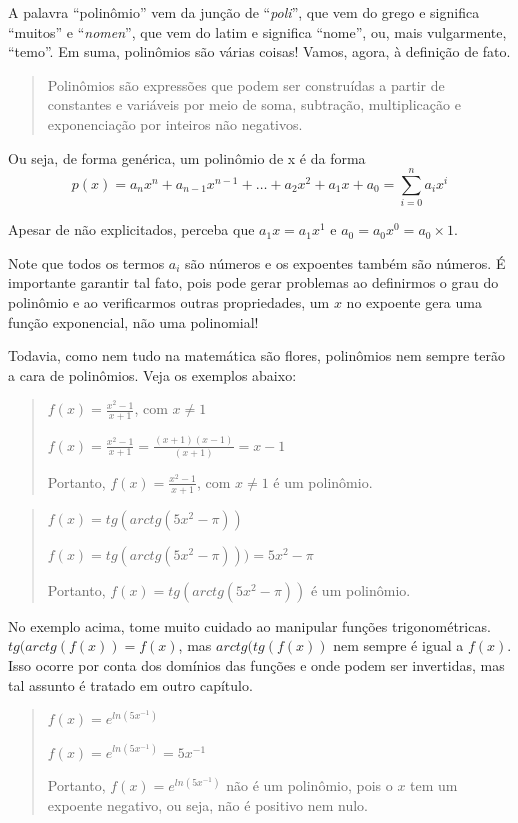\documentclass[
  letterpaper,
  DIV=11,
  numbers=noendperiod]{scrreprt}
\begin{document}
A palavra ``polinômio'' vem da junção de ``\emph{poli}'', que vem do
grego e significa ``muitos'' e ``\emph{nomen}'', que vem do latim e
significa ``nome'', ou, mais vulgarmente, ``temo''. Em suma, polinômios
são várias coisas! Vamos, agora, à definição de fato.

\begin{quote}
Polinômios são expressões que podem ser construídas a partir de
constantes e variáveis por meio de soma, subtração, multiplicação e
exponenciação por inteiros não negativos.
\end{quote}

Ou seja, de forma genérica, um polinômio de x é da forma \[
p(x) = a_{n}x^{n} + a_{n-1} x^{n-1} + \dots + a_{2}x^{2}+a_{1}x+a_{0} = \sum_{i=0}^{n} a_{i} x^{i}
\]

Apesar de não explicitados, perceba que \(a_1x = a_1x^1\) e
\(a_0 = a_0x^0 = a_0\times1\).

Note que todos os termos \(a_i\) são números e os expoentes também são
números. É importante garantir tal fato, pois pode gerar problemas ao
definirmos o grau do polinômio e ao verificarmos outras propriedades, um
\(x\) no expoente gera uma função exponencial, não uma polinomial!

Todavia, como nem tudo na matemática são flores, polinômios nem sempre
terão a cara de polinômios. Veja os exemplos abaixo:

\begin{quote}
\(f(x) =\frac{x^2-1}{x+1}\), com \(x\neq1\)

\(f(x)=\frac{x^2-1}{x+1}=  \frac{(x+1)(x-1)}{(x+1)} =x-1\)

Portanto, \(f(x) = \frac{x^2-1}{x+1}\), com \(x\neq1\) é um polinômio.
\end{quote}

\begin{quote}
\(f(x)=tg(arctg(5x^2-\pi))\)

\(f(x) = tg(arctg(5x^2-\pi))) = 5x^2-\pi\)

Portanto, \(f(x)=tg(arctg(5x^2-\pi))\) é um polinômio.
\end{quote}

No exemplo acima, tome muito cuidado ao manipular funções
trigonométricas. \(tg(arctg(f(x))=f(x)\), mas \(arctg(tg(f(x))\) nem
sempre é igual a \(f(x)\). Isso ocorre por conta dos domínios das
funções e onde podem ser invertidas, mas tal assunto é tratado em outro
capítulo.

\begin{quote}
\(f(x) = e^{ln(5 x^{-1})}\)

\(f(x) = e^{ln(5 x^{-1})} = 5x^{-1}\)

Portanto, \(f(x) = e^{ln(5 x^{-1})}\) não é um polinômio, pois o \(x\)
tem um expoente negativo, ou seja, não é positivo nem nulo.
\end{quote}
\end{document}

